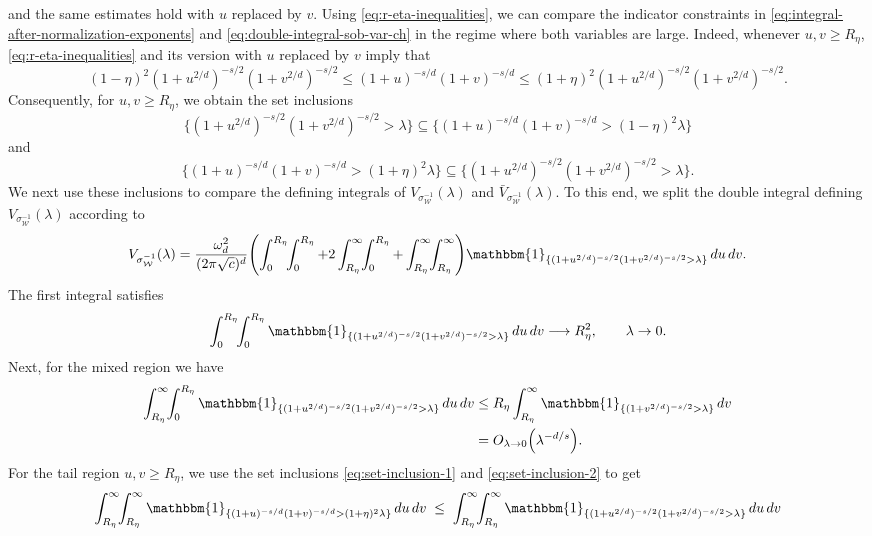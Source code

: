 \documentclass[a4paper,12pt]{article}
\let\originalleft\left
\let\originalright\right
\renewcommand{\left}{\mathopen{}\mathclose\bgroup\originalleft}
\renewcommand{\right}{\aftergroup\egroup\originalright}
\newcommand{\symbolnotsobw}{\symbolnot_{\mathcal{W}}}
\newcommand{\symbolnot}{\sigma}
\begin{document}
and the same estimates hold with $u$ replaced by $v$. Using \eqref{eq:r-eta-inequalities}, we can compare the indicator constraints
in \eqref{eq:integral-after-normalization-exponents} and
\eqref{eq:double-integral-sob-var-ch} in the regime where both variables are large.
Indeed, whenever $u,v\ge R_\eta$, \eqref{eq:r-eta-inequalities} and its version with $u$ replaced by $v$ imply that
\[
(1-\eta)^2 (1+u^{2/d})^{-s/2}(1+v^{2/d})^{-s/2}
\le
(1+u)^{-s/d}(1+v)^{-s/d}
\le
(1+\eta)^2 (1+u^{2/d})^{-s/2}(1+v^{2/d})^{-s/2}.
\]
Consequently, for $u,v\ge R_\eta$, we obtain the set inclusions
\begin{equation}\label{eq:set-inclusion-1}
\{(1+u^{2/d})^{-s/2}(1+v^{2/d})^{-s/2}>\lambda\}
\subseteq
\{(1+u)^{-s/d}(1+v)^{-s/d}>(1-\eta)^2\lambda\}
\end{equation}
and
\begin{equation}\label{eq:set-inclusion-2}
\{(1+u)^{-s/d}(1+v)^{-s/d}>(1+\eta)^2\lambda\}
\subseteq
\{(1+u^{2/d})^{-s/2}(1+v^{2/d})^{-s/2}>\lambda\}.
\end{equation}
We next use these inclusions to compare the defining integrals of
$V_{\symbolnotsobw^{-1}}(\lambda)$ and $\bar V_{\symbolnotsobw^{-1}}(\lambda)$.
To this end, we split the double integral defining
$V_{\symbolnotsobw^{-1}}(\lambda)$ according to 
\[
V_{\symbolnotsobw^{-1}}(\lambda)
=
\frac{\omega_d^2}{(2\pi\sqrt{c})^{d}}
\left(
\int_{0}^{R_\eta}\!\!\int_{0}^{R_\eta}
+
2\int_{R_\eta}^{\infty}\!\!\int_{0}^{R_\eta}
+
\int_{R_\eta}^{\infty}\!\!\int_{R_\eta}^{\infty}
\right)
\mathbbm{1}_{\{(1+u^{2/d})^{-s/2}(1+v^{2/d})^{-s/2}>\lambda\}}
\,du\,dv .
\]
The first integral satisfies
\[
\int_{0}^{R_\eta}\!\!\int_{0}^{R_\eta}
\mathbbm{1}_{\{(1+u^{2/d})^{-s/2}(1+v^{2/d})^{-s/2}>\lambda\}}
\,du\,dv
\longrightarrow
R_\eta^{2},
\qquad \lambda\to0 .
\]
Next, for the mixed region we have
\begin{align*}
\int_{R_\eta}^{\infty}\!\!\int_{0}^{R_\eta}
\mathbbm{1}_{\{(1+u^{2/d})^{-s/2}(1+v^{2/d})^{-s/2}>\lambda\}}
\,du\,dv
&\le
R_\eta
\int_{R_\eta}^{\infty}
\mathbbm{1}_{\{(1+v^{2/d})^{-s/2}>\lambda\}}\,dv \\
&=
O_{\lambda\to0} \left(\lambda^{-d/s}\right).
\end{align*}
For the tail region $u,v\ge R_\eta$, we use
the set inclusions \eqref{eq:set-inclusion-1} and
\eqref{eq:set-inclusion-2} to get
\[
\int_{R_\eta}^{\infty}\!\!\int_{R_\eta}^{\infty}
\mathbbm{1}_{\{(1+u)^{-s/d}(1+v)^{-s/d}>(1+\eta)^2\lambda\}}
\,du\,dv
\;\le\;
\int_{R_\eta}^{\infty}\!\!\int_{R_\eta}^{\infty}
\mathbbm{1}_{\{(1+u^{2/d})^{-s/2}(1+v^{2/d})^{-s/2}>\lambda\}}
\,du\,dv
\]
\end{document}
